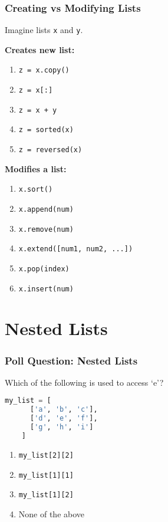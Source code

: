 \documentclass{beamer}
\begin{document}
%
%
\begin{frame}[fragile]
  \frametitle{Creating vs Modifying Lists}
  Imagine lists \lstinline|x| and \lstinline|y|.\\
  \vfill
  \begin{minipage}{0.49\textwidth}
    \textbf{Creates new list:}
    \begin{enumerate}[A]
      \item \lstinline|z = x.copy()|
      \item \lstinline|z = x[:]|
      \item \lstinline|z = x + y|
      \item \lstinline|z = sorted(x)|
      \item \lstinline|z = reversed(x)|
    \end{enumerate}
  \end{minipage}
  \begin{minipage}{0.49\textwidth}
    \textbf{Modifies a list:}
    \begin{enumerate}[A]
      \item \lstinline|x.sort()|
      \item \lstinline|x.append(num)|
      \item \lstinline|x.remove(num)|
      \item \lstinline|x.extend([num1, num2, ...])|
      \item \lstinline|x.pop(index)|
      \item \lstinline|x.insert(num)|
    \end{enumerate}
  \end{minipage}
\end{frame}



\section{Nested Lists}

\begin{frame}[fragile]
  \frametitle{Poll Question: Nested Lists}
  Which of the following is used to access `e'?
  \begin{lstlisting}[language=Python, autogobble]
  my_list = [
      ['a', 'b', 'c'],
      ['d', 'e', 'f'],
      ['g', 'h', 'i']
    ]
  \end{lstlisting}
  \vfill
  \begin{enumerate}[A]
    \item \lstinline|my_list[2][2]|
    \item \lstinline|my_list[1][1]|
    \item \lstinline|my_list[1][2]|
    \item None of the above
  \end{enumerate}
\end{frame}
\end{document}
